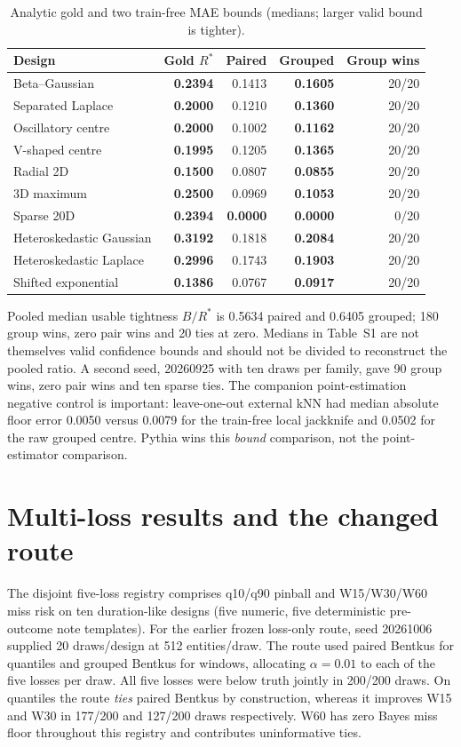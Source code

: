 \documentclass[10pt]{article}
\begin{document}
\begin{table}[h]
\centering\small
\caption{Analytic gold and two train-free MAE bounds (medians; larger valid bound is tighter).}
\begin{tabular}{lrrrr}
\toprule
Design & Gold $R^*$ & Paired & Grouped & Group wins \\
\midrule
Beta--Gaussian & \textbf{0.2394} & 0.1413 & \textbf{0.1605} & 20/20 \\
Separated Laplace & \textbf{0.2000} & 0.1210 & \textbf{0.1360} & 20/20 \\
Oscillatory centre & \textbf{0.2000} & 0.1002 & \textbf{0.1162} & 20/20 \\
V-shaped centre & \textbf{0.1995} & 0.1205 & \textbf{0.1365} & 20/20 \\
Radial 2D & \textbf{0.1500} & 0.0807 & \textbf{0.0855} & 20/20 \\
3D maximum & \textbf{0.2500} & 0.0969 & \textbf{0.1053} & 20/20 \\
Sparse 20D & \textbf{0.2394} & \textbf{0.0000} & \textbf{0.0000} & 0/20 \\
Heteroskedastic Gaussian & \textbf{0.3192} & 0.1818 & \textbf{0.2084} & 20/20 \\
Heteroskedastic Laplace & \textbf{0.2996} & 0.1743 & \textbf{0.1903} & 20/20 \\
Shifted exponential & \textbf{0.1386} & 0.0767 & \textbf{0.0917} & 20/20 \\
\bottomrule
\end{tabular}
\end{table}

Pooled median usable tightness $B/R^*$ is 0.5634 paired and 0.6405 grouped; 180 group wins, zero pair wins and 20 ties at zero. Medians in Table~S1 are not themselves valid confidence bounds and should not be divided to reconstruct the pooled ratio. A second seed, 20260925 with ten draws per family, gave 90 group wins, zero pair wins and ten sparse ties. The companion point-estimation negative control is important: leave-one-out external kNN had median absolute floor error 0.0050 versus 0.0079 for the train-free local jackknife and 0.0502 for the raw grouped centre. Pythia wins this \emph{bound} comparison, not the point-estimator comparison.

\section{Multi-loss results and the changed route}
The disjoint five-loss registry comprises q10/q90 pinball and W15/W30/W60 miss risk on ten duration-like designs (five numeric, five deterministic pre-outcome note templates). For the earlier frozen loss-only route, seed 20261006 supplied 20 draws/design at 512 entities/draw. The route used paired Bentkus for quantiles and grouped Bentkus for windows, allocating $\alpha=0.01$ to each of the five losses per draw. All five losses were below truth jointly in 200/200 draws. On quantiles the route \emph{ties} paired Bentkus by construction, whereas it improves W15 and W30 in 177/200 and 127/200 draws respectively. W60 has zero Bayes miss floor throughout this registry and contributes uninformative ties.
\end{document}
